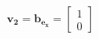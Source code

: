 \documentclass[preview]{standalone}
\begin{document}
\begin{align*}
\mathbf{v_2} = \mathbf{b}_{\mathbf{e_x}} = \begin{bmatrix} 1 \\ 0 \end{bmatrix}
\end{align*}
\end{document}
